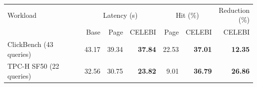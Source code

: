 {\footnotesize
\begin{tabular}{@{}lrrrrrr@{}}
\toprule
Workload
& \multicolumn{3}{c}{Latency (s)}
& \multicolumn{2}{c}{Hit (\%)}
& \shortstack{Reduction\\(\%)} \\
\cmidrule(lr){2-4}\cmidrule(lr){5-6}
& Base & Page & CELEBI
& Page & CELEBI & CELEBI \\
\midrule
ClickBench (43 queries)
& 43.17 & 39.34 & \textbf{37.84}
& 22.53 & \textbf{37.01} & \textbf{12.35} \\
TPC-H SF50 (22 queries)
& 32.56 & 30.75 & \textbf{23.82}
& 9.01 & \textbf{36.79} & \textbf{26.86} \\
\bottomrule
\end{tabular}
}
